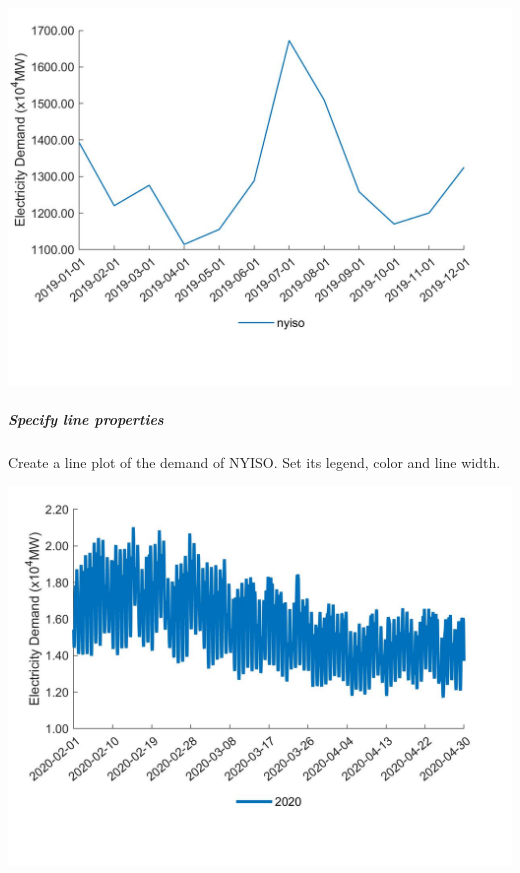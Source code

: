 \documentclass[11pt]{article}
\numberwithin{equation}{section}
\numberwithin{table}{section}
\numberwithin{figure}{section}
\begin{document}
\begin{center}
  \noindent\includegraphics[width=\textwidth]{figures/plot_demand_example2.jpg}
\end{center}

\subparagraph{Specify line properties}
Create a line plot of the demand of NYISO. Set its legend, color and line width.


\begin{center}
  \noindent\includegraphics[width=\textwidth]{figures/plot_demand_example3.jpg}
\end{center}
\end{document}
